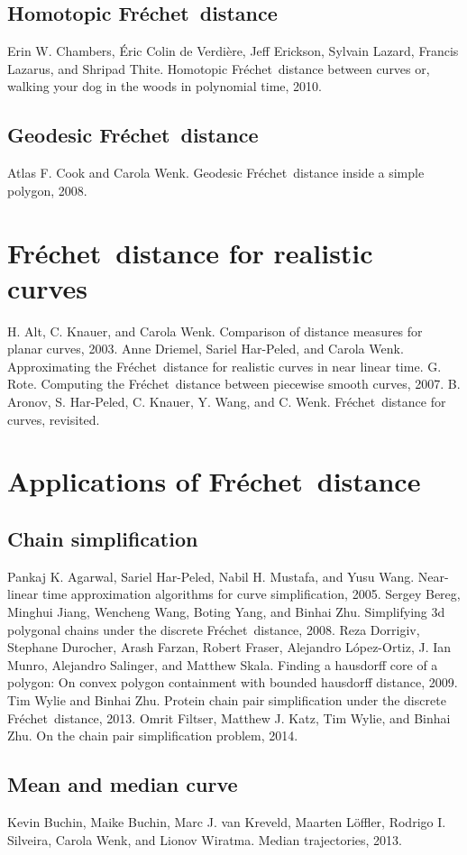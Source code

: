 \documentclass[a4paper,onecolumn]{article}
\numberwithin{equation}{section}
\numberwithin{figure}{section}
\numberwithin{algorithm}{section}
\theoremstyle{plain}
\theoremstyle{definition}
\theoremstyle{remark}
\newcommand{\frechet}{Fr\'echet}
\begin{document}
\subsection{Homotopic \frechet\ distance}
Erin W. Chambers, \'Eric Colin de Verdi\`ere, Jeff Erickson, Sylvain Lazard, Francis Lazarus, and Shripad Thite. Homotopic \frechet\ distance between curves or, walking your dog in the woods in polynomial time, 2010.
\subsection{Geodesic \frechet\ distance}
Atlas F. Cook and Carola Wenk. Geodesic \frechet\ distance inside a simple polygon, 2008.
\section{\frechet\ distance for realistic curves}
H. Alt, C. Knauer, and Carola Wenk. Comparison of distance measures for planar curves, 2003.
Anne Driemel, Sariel Har-Peled, and Carola Wenk. Approximating the \frechet\ distance for realistic curves in near linear time.
G. Rote. Computing the \frechet\ distance between piecewise smooth curves, 2007.
B. Aronov, S. Har-Peled, C. Knauer, Y. Wang, and C. Wenk. \frechet\ distance for curves, revisited.
\section{Applications of \frechet\ distance}
\subsection{Chain simplification}
Pankaj K. Agarwal, Sariel Har-Peled, Nabil H. Mustafa, and Yusu Wang. Near-linear time approximation algorithms for curve simplification, 2005.
Sergey Bereg, Minghui Jiang, Wencheng Wang, Boting Yang, and Binhai Zhu. Simplifying 3d polygonal chains under the discrete \frechet\ distance, 2008.
Reza Dorrigiv, Stephane Durocher, Arash Farzan, Robert Fraser, Alejandro L\'opez-Ortiz, J. Ian Munro, Alejandro Salinger, and Matthew Skala. Finding a hausdorff core of a polygon: On convex polygon containment with bounded hausdorff distance, 2009.
Tim Wylie and Binhai Zhu. Protein chain pair simplification under the discrete \frechet\ distance, 2013.
Omrit Filtser, Matthew J. Katz, Tim Wylie, and Binhai Zhu. On the chain pair simplification problem, 2014.
\subsection{Mean and median curve}
Kevin Buchin, Maike Buchin, Marc J. van Kreveld, Maarten L\"offler, Rodrigo I. Silveira, Carola Wenk, and Lionov Wiratma. Median trajectories, 2013.
\end{document}
